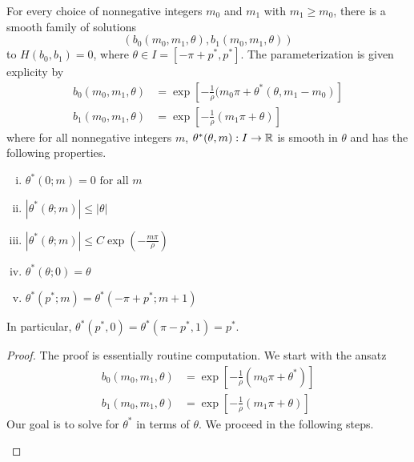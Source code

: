 \documentclass[thesis.tex]{subfiles}
\begin{document}

\begin{lemma}\label{thetaparamlemma}
For every choice of nonnegative integers $m_0$ and $m_1$ with $m_1 \geq m_0$, there is a smooth family of solutions
\[
\left( b_0( m_0, m_1, \theta), b_1( m_0, m_1, \theta) \right)
\]
to $H(b_0, b_1) = 0$, where $\theta \in I = [-\pi + p^*, p^*]$. The parameterization is given explicity by
\begin{equation}\label{thetaparam}
\begin{aligned}
b_0( m_0, m_1, \theta) &= \exp\left[ -\frac{1}{\rho}(m_0 \pi + \theta^*(\theta, m_1 - m_0) \right] \\
b_1( m_0, m_1, \theta) &= \exp\left[ -\frac{1}{\rho}(m_1 \pi + \theta) \right]
\end{aligned}
\end{equation}
where for all nonnegative integers $m$, $\theta^*(\theta, m) : I \rightarrow \mathbb{R}$ is smooth in $\theta$ and has the following properties.
\begin{enumerate}[(i)]
\item $\theta^*(0; m) = 0 \text{ for all } m$
\item $|\theta^*(\theta; m)| \leq |\theta|$
\item $|\theta^*(\theta; m)| \leq C \exp\left(-\frac{m \pi}{\rho} \right)$
\item $\theta^*(\theta; 0) = \theta $
\item $\theta^*(p^*; m) = \theta^*(-\pi+p^*; m+1)$
\end{enumerate}
In particular, $\theta^*(p^*, 0) = \theta^*(\pi - p^*, 1) = p^*$.
\begin{proof}
The proof is essentially routine computation. We start with the ansatz
\begin{equation}\label{thetaansatz}
\begin{aligned}
b_0( m_0, m_1, \theta) &= \exp\left[ -\frac{1}{\rho}(m_0 \pi + \theta^*) \right] \\
b_1( m_0, m_1, \theta) &= \exp\left[ -\frac{1}{\rho}(m_1 \pi + \theta) \right]
\end{aligned}
\end{equation}
Our goal is to solve for $\theta^*$ in terms of $\theta$. We proceed in the following steps.
\begin{enumerate}


\end{enumerate}
\end{proof}
\end{lemma}
\end{document}
